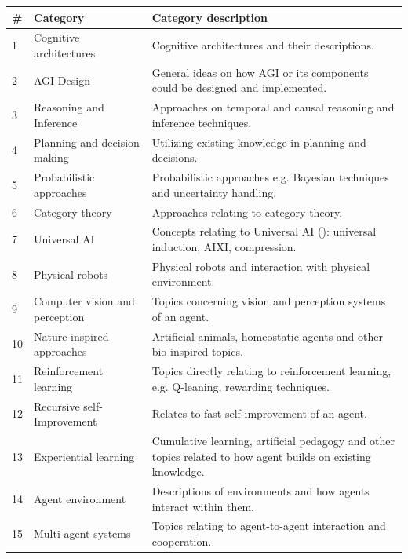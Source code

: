 \documentclass[utf8,english]{gradu3}
\begin{document}
\begin{table}[H]
  \footnotesize
  \centering
  \begin{tabular}{p{0.05\linewidth} p{0.30\linewidth} p{0.65\linewidth}}

    \textbf{\#} & \textbf{Category}  & \textbf{Category description}  \\ \hline
    1  & Cognitive architectures & Cognitive architectures and their descriptions.  \\ \hline
    2  & AGI Design & General ideas on how AGI or its components could be designed and implemented. \\ \hline
    3	 & Reasoning and Inference &  Approaches on temporal and causal reasoning and inference techniques. \\ \hline
    4	 & Planning and decision making & Utilizing existing knowledge in planning and decisions. \\ \hline
    5	 & Probabilistic approaches & Probabilistic approaches e.g. Bayesian techniques and uncertainty handling.\\ \hline
    6	 & Category theory & Approaches relating to category theory.\\ \hline
    7	 & Universal AI & Concepts relating to Universal AI (\cite{hutter2004}): universal induction, AIXI, compression.\\ \hline
    8	 & Physical robots & Physical robots and interaction with physical environment. \\ \hline
    9	 & Computer vision and perception & Topics concerning vision and perception systems of an agent.\\ \hline
    10 & Nature-inspired approaches & Artificial animals, homeostatic agents and other bio-inspired topics.\\ \hline
    11 & Reinforcement learning & Topics directly relating to reinforcement learning, e.g. Q-leaning, rewarding techniques.\\ \hline
    12 & Recursive self-Improvement & Relates to fast self-improvement of an agent. \\ \hline
    13 & Experiential learning & Cumulative learning, artificial pedagogy and other topics related to how agent builds on existing knowledge.\\ \hline
    14 & Agent environment & Descriptions of environments and how agents interact within them.\\ \hline
    15 & Multi-agent systems & Topics relating to agent-to-agent interaction and cooperation.\\ \hline

\end{tabular}
\end{table}
\end{document}
